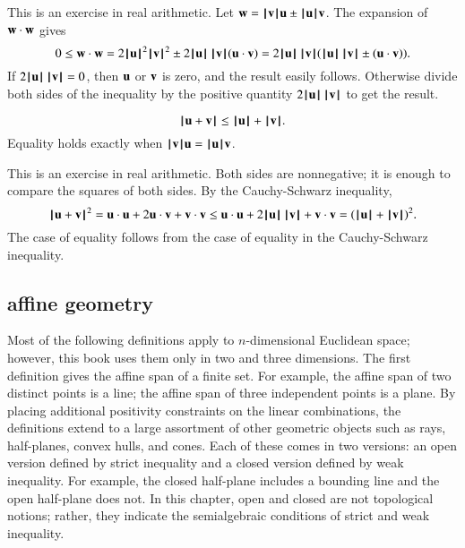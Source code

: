 \begin{proved}
  This is an exercise in real arithmetic.  Let $\w = \normo{\v} \u \pm
  \normo{\u} \v$.  The expansion of $\w\cdot \w$ gives
  \begin{displaymath}0\le \w\cdot \w = 2\normo{\u}^2\normo{\v}^2 \pm
    2\normo{\u}\, \normo{\v} (\u\cdot \v) = 2\normo{\u}\, \normo{\v}
    (\normo{\u}\, \normo{\v} \pm (\u \cdot \v)).\end{displaymath} If
  $2\normo{\u} \,\normo{\v} = 0$, then $\u$ or $\v$ is zero, and the
  result easily follows.  Otherwise divide both sides of the
  inequality by the positive quantity $2 \normo{\u} \,\normo{\v}$ to
  get the result.  \swallowed\end{proved}

\begin{lemma}
\label{lemma:triangle-ineq}
\begin{displaymath}
\normo{\u + \v} \le \normo{\u} + \normo{\v }.
\end{displaymath}
Equality holds exactly when $\normo{\v}\u = \normo{\u}\v$.
\end{lemma}
%

\begin{proved}  This is an exercise in real arithmetic.
Both sides are nonnegative; it is enough to compare the squares of
both sides.  By the Cauchy-Schwarz inequality,
\begin{displaymath}\normo{\u + \v}^2 = \u\cdot \u + 2 \u\cdot \v + \v\cdot \v \le
  \u\cdot \u + 2 \normo{ \u}\,\normo{\v} + \v\cdot \v = (\normo{\u}+\normo{\v})^2.
\end{displaymath}
The case of equality follows from the case of equality in the
Cauchy-Schwarz inequality.
\swallowed\end{proved}



\subsection{affine geometry}




Most of the following definitions apply to
  $n$-dimensional Euclidean space; however, this book uses them only
  in two and three dimensions.  The first definition gives the affine
  span of a finite set.  For example, the affine span of two distinct
  points is a line; the affine span of three independent points is a
  plane.  By placing additional positivity constraints on the linear
  combinations, the definitions extend to a large assortment of other
  geometric objects such as rays, half-planes, convex hulls, and
  cones.  Each of these comes in two versions: an open version defined
  by strict inequality and a closed version defined by weak
  inequality.  For example, the closed half-plane includes a bounding
  line and the open half-plane does not.  In this chapter, open and
  closed are not topological notions; rather, they indicate the
  semialgebraic conditions of strict and weak inequality.


